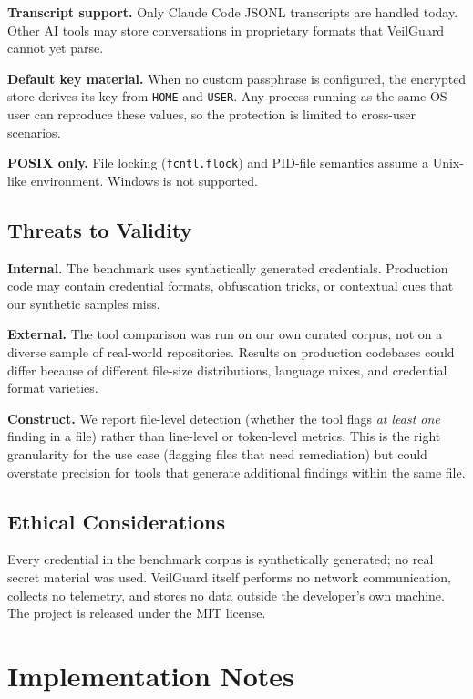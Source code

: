 \documentclass[conference]{IEEEtran}
\begin{document}
\textbf{Transcript support.} Only Claude Code JSONL transcripts are handled
today. Other AI tools may store conversations in proprietary formats that
VeilGuard cannot yet parse.

\textbf{Default key material.} When no custom passphrase is configured, the
encrypted store derives its key from \texttt{HOME} and \texttt{USER}. Any
process running as the same OS user can reproduce these values, so the
protection is limited to cross-user scenarios.

\textbf{POSIX only.} File locking (\texttt{fcntl.flock}) and PID-file
semantics assume a Unix-like environment. Windows is not supported.

\subsection{Threats to Validity}

\textbf{Internal.} The benchmark uses synthetically generated credentials.
Production code may contain credential formats, obfuscation tricks, or
contextual cues that our synthetic samples miss.

\textbf{External.} The tool comparison was run on our own curated corpus, not
on a diverse sample of real-world repositories. Results on production codebases
could differ because of different file-size distributions, language mixes, and
credential format varieties.

\textbf{Construct.} We report file-level detection (whether the tool flags
\emph{at least one} finding in a file) rather than line-level or token-level
metrics. This is the right granularity for the use case (flagging files that
need remediation) but could overstate precision for tools that generate
additional findings within the same file.

\subsection{Ethical Considerations}

Every credential in the benchmark corpus is synthetically generated; no real
secret material was used. VeilGuard itself performs no network communication,
collects no telemetry, and stores no data outside the developer's own machine.
The project is released under the MIT license.


\section{Implementation Notes}
\label{sec:impl}
\end{document}
